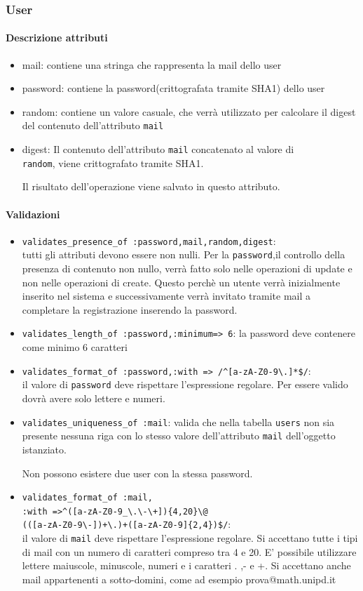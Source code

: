 \documentclass[11pt,a4paper]{article}
\begin{document}
\subsubsection{User}
\paragraph{Descrizione attributi}
\begin{itemize}
 \item mail: contiene una stringa che rappresenta la mail dello user
 \item password: contiene la password(crittografata tramite SHA1) dello user
 \item random: contiene un valore casuale, che verrà utilizzato per calcolare il digest del contenuto dell'attributo \verb|mail|
 \item digest: Il contenuto dell'attributo \verb|mail| concatenato al valore di 
 \\ \verb|random|, viene crittografato tramite SHA1. 

Il risultato dell'operazione viene salvato in questo attributo.
\end{itemize}
\paragraph{Validazioni}
\begin{itemize}
\item \verb|validates_presence_of :password,mail,random,digest|:\\tutti gli attributi devono essere non nulli. Per la \verb|password|,il controllo della presenza di contenuto non nullo, verrà fatto solo nelle operazioni di update e non nelle operazioni di create. Questo perchè un utente verrà inizialmente inserito nel sistema e successivamente verrà invitato tramite mail a completare la registrazione inserendo la password. 
\item \verb|validates_length_of :password,:minimum=> 6|: la password deve contenere come minimo 6 caratteri
\item \verb|validates_format_of :password,:with => /^[a-zA-Z0-9\.]*$/|:\\il valore di \verb|password| deve rispettare l'espressione regolare. Per essere valido dovrà avere solo lettere e numeri.
 \item \verb|validates_uniqueness_of :mail|: valida che nella tabella \verb|users| non sia presente nessuna riga con lo stesso valore dell'attributo \verb|mail| dell'oggetto istanziato. 

Non possono esistere due user con la stessa password.  
 \item \verb|validates_format_of :mail,|\\ 
\verb|:with =>^([a-zA-Z0-9_\.\-\+]){4,20}\@|\\ \verb|(([a-zA-Z0-9\-])+\.)+([a-zA-Z0-9]{2,4})$/|:\\
il valore di \verb|mail| deve rispettare l'espressione regolare. Si accettano tutte i tipi di mail con un numero di caratteri compreso tra 4 e 20. E' possibile utilizzare lettere maiuscole, minuscole, numeri e i caratteri . ,- e +.
Si accettano anche mail appartenenti a sotto-domini, come ad esempio prova@math.unipd.it  
\end{itemize}
\end{document}
